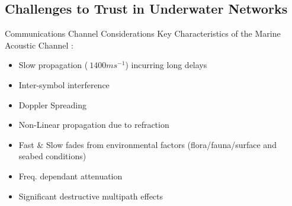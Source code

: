 \documentclass{beamer}
\begin{document}
\subsection{Challenges to Trust in Underwater Networks}

\begin{frame}{Communications Channel Considerations}
  Key Characteristics of the Marine Acoustic Channel \autocite{Urick1983a,Partan2006,Stojanovic2007,Stefanov2011}:
  \begin{itemize}
    \item Slow propagation ($~1400ms^{-1}$) incurring long delays
    \item Inter-symbol interference
    \item Doppler Spreading
    \item Non-Linear propagation due to refraction
    \item Fast \& Slow fades from environmental factors (flora/fauna/surface and seabed conditions)
    \item Freq. dependant attenuation
    \item Significant destructive multipath effects
  \end{itemize}
  
\end{frame}
\end{document}
